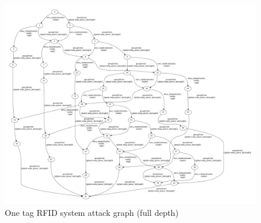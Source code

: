 \begin{figure}
\includegraphics[width=6in]{ag_dash7/sleep_ag_11}
\caption{One tag RFID system attack graph (full depth)}
\label{fig:rfid1_ag11}
\end{figure}